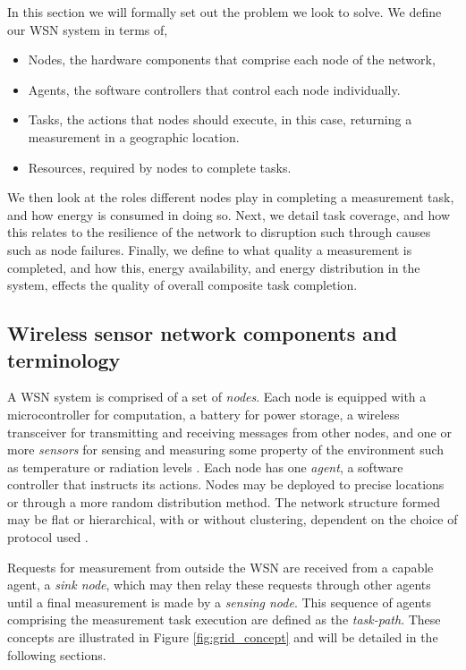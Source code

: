 In this section we will formally set out the problem we look to solve. We define our WSN system in terms of,
\begin{itemize}
	\item Nodes, the hardware components that comprise each node of the network,
	\item Agents, the software controllers that control each node individually.
	\item Tasks, the actions that nodes should execute, in this case, returning a measurement in a geographic location.
	\item Resources, required by nodes to complete tasks.  
\end{itemize}
We then look at the roles different nodes play in completing a measurement task, and how energy is consumed in doing so. Next, we detail task coverage, and how this relates to the resilience of the network to disruption such through causes such as node failures. Finally, we define to what quality a measurement is completed, and how this, energy availability, and energy distribution in the system, effects the quality of overall composite task completion. 

\subsection{Wireless sensor network components and terminology}

A WSN system is comprised of a set of \textit{nodes}. Each node is equipped with a microcontroller for computation, a battery for power storage, a wireless transceiver for  transmitting and receiving messages from other nodes, and one or more \textit{sensors} for sensing and measuring some property of the environment such as temperature or radiation levels \citep{muhammad_r_ahmed_2012_1072589}. Each node has one \textit{agent}, a software controller that instructs its actions. Nodes may be deployed to precise locations or through a more random distribution method. The network structure formed may be flat or hierarchical, with or without clustering, dependent on the choice of protocol used \citep{Carlos-Mancilla2016b}. 


Requests for measurement from outside the WSN are received from a capable agent, a \textit{sink node}, which may then relay these requests through other agents until a final measurement is made by a \textit{sensing node}. This sequence of agents comprising the measurement task execution are defined as the \textit{task-path}. These concepts are illustrated in Figure \ref{fig:grid_concept} and will be detailed in the following sections.